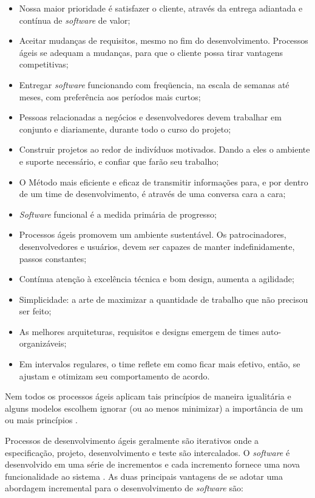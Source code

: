 \begin{itemize}
    \item Nossa maior prioridade é satisfazer o cliente, através da entrega adiantada e contínua de \textit{software} de valor;
    \item Aceitar mudanças de requisitos, mesmo no fim do desenvolvimento. Processos ágeis se adequam a mudanças, para que o cliente possa tirar vantagens competitivas;
    \item Entregar \textit{software} funcionando com freqüencia, na escala de semanas até meses, com preferência aos períodos mais curtos;
    \item Pessoas relacionadas a negócios e desenvolvedores devem trabalhar em conjunto e diariamente, durante todo o curso do projeto;
    \item Construir projetos ao redor de indivíduos motivados. Dando a eles o ambiente e suporte necessário, e confiar que farão seu trabalho;
    \item O Método mais eficiente e eficaz de transmitir informações para, e por dentro de um time de desenvolvimento, é através de uma conversa cara a cara;
    \item \textit{Software} funcional é a medida primária de progresso;
    \item Processos ágeis promovem um ambiente sustentável. Os patrocinadores, desenvolvedores e usuários, devem ser capazes de manter indefinidamente, passos constantes;
    \item Contínua atenção à excelência técnica e bom design, aumenta a agilidade;
    \item Simplicidade: a arte de maximizar a quantidade de trabalho que não precisou ser feito;
    \item As melhores arquiteturas, requisitos e designs emergem de times auto-organizáveis;
    \item Em intervalos regulares, o time reflete em como ficar mais efetivo, então, se ajustam e otimizam seu comportamento de acordo.
\end{itemize}

Nem todos os processos ágeis aplicam tais princípios de maneira igualitária e alguns modelos escolhem ignorar (ou ao menos minimizar) a importância de um ou mais princípios \cite{pressman_2009}.

Processos de desenvolvimento ágeis geralmente são iterativos onde a
especificação, projeto, desenvolvimento e teste são intercalados. O \textit{software} é desenvolvido
em uma série de incrementos e cada incremento fornece uma nova funcionalidade ao sistema \cite{sommerville_2006}. As duas principais
vantagens de se adotar uma abordagem incremental para o desenvolvimento de \textit{software} são:

